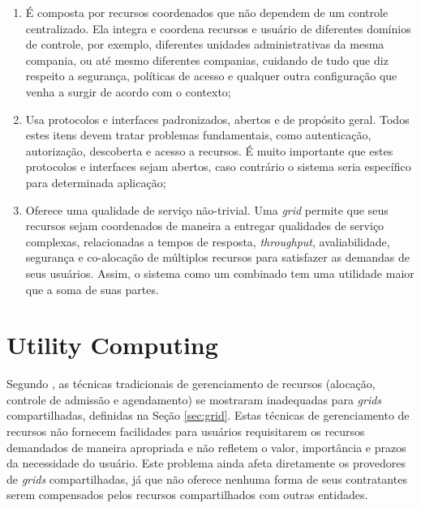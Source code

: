 \begin{enumerate}
    \item
        É composta por recursos coordenados que não dependem de um controle centralizado. Ela integra e
        coordena recursos e usuário de diferentes domínios de controle, por exemplo, diferentes unidades
        administrativas da mesma compania, ou até mesmo diferentes companias, cuidando de tudo que  diz
        respeito a segurança, políticas de acesso e qualquer outra configuração que venha a surgir de acordo
        com o contexto;

    \item
        Usa protocolos e interfaces padronizados, abertos e de propósito geral. Todos estes itens
        devem tratar problemas fundamentais, como autenticação, autorização, descoberta e acesso a
        recursos. É muito importante que estes protocolos e interfaces sejam abertos, caso contrário
        o sistema seria específico para determinada aplicação;

    \item
        Oferece uma qualidade de serviço não-trivial. Uma \emph{grid} permite que seus recursos sejam
        coordenados de maneira a entregar qualidades de serviço complexas, relacionadas a
        tempos de resposta, \textit{throughput}, avaliabilidade, segurança e co-alocação
        de múltiplos recursos para satisfazer as demandas de seus usuários. Assim, o sistema
        como um combinado tem uma utilidade maior que a soma de suas partes.

\end{enumerate}

\section{Utility Computing}

Segundo , as técnicas tradicionais de gerenciamento de recursos
(alocação, controle de admissão e agendamento) se mostraram inadequadas para \emph{grids} compartilhadas,
definidas na Seção \ref{sec:grid}. Estas técnicas de gerenciamento de recursos não
fornecem facilidades para usuários requisitarem os recursos demandados de maneira apropriada e não refletem o valor,
importância e prazos da necessidade do usuário. Este problema ainda afeta diretamente os provedores
de \emph{grids} compartilhadas, já que não oferece nenhuma forma de seus contratantes serem compensados pelos recursos
compartilhados com outras entidades.

